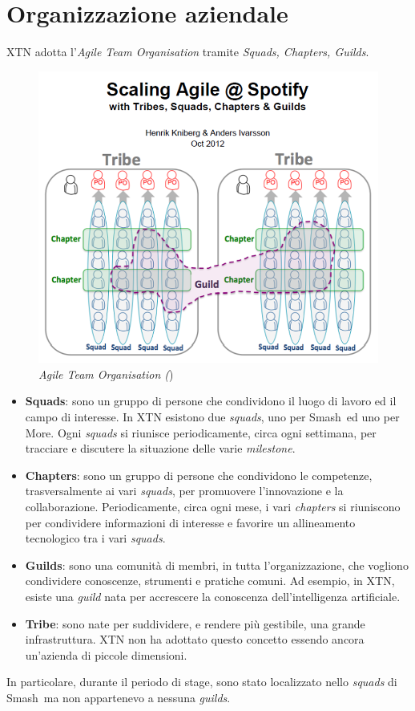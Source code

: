 \section{Organizzazione aziendale}
XTN adotta l'\textit{Agile Team Organisation} tramite \textit{Squads, Chapters, Guilds}.
\begin{figure}[ht]
	\centering
	\includegraphics[scale=0.6]{immagini/agile-org.png}
	\caption{\textit{Agile Team Organisation (})}
\end{figure}
\begin{itemize}
\item{\textbf{Squads}:} sono un gruppo di persone che condividono il luogo di lavoro ed il campo di interesse. In XTN esistono due \textit{squads}, uno per  Smash\textregistered\ ed uno per More\textregistered. Ogni \textit{squads} si riunisce periodicamente, circa ogni settimana, per tracciare e discutere la situazione delle varie \textit{milestone}. 
\item{\textbf{Chapters}:} sono un gruppo di persone che condividono le competenze, trasversalmente ai vari \textit{squads}, per promuovere l'innovazione e la collaborazione. Periodicamente, circa ogni mese, i vari \textit{chapters} si riuniscono per condividere informazioni di interesse e favorire un allineamento tecnologico tra i vari \textit{squads}.
\item{\textbf{Guilds}:} sono una comunità di membri, in tutta l'organizzazione, che vogliono condividere conoscenze, strumenti e pratiche comuni. Ad esempio, in XTN, esiste una \textit{guild} nata per accrescere la conoscenza dell'intelligenza artificiale.
\item{\textbf{Tribe}:} sono nate per suddividere, e rendere più gestibile, una grande infrastruttura. XTN non ha adottato questo concetto essendo ancora un'azienda di piccole dimensioni.
\end{itemize}
In particolare, durante il periodo di stage, sono stato localizzato nello \textit{squads} di Smash\textregistered\, ma non appartenevo a nessuna \textit{guilds}.
\newpage

